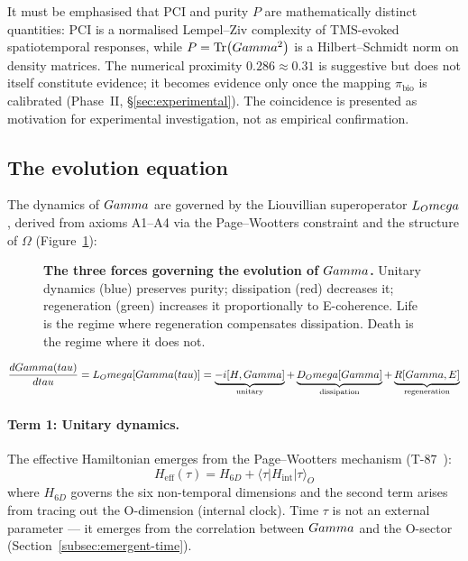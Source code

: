 It must be emphasised that PCI and purity $P$ are mathematically distinct
quantities: PCI is a normalised Lempel--Ziv complexity of TMS-evoked
spatiotemporal responses, while $P = \Tr(Gamma^2)$ is a Hilbert--Schmidt norm
on density matrices. The numerical proximity $0.286 \approx 0.31$ is
suggestive but does not itself constitute evidence; it becomes evidence only
once the mapping $\pi_{\mathrm{bio}}$ is calibrated (Phase~II,
\S\ref{sec:experimental}). The coincidence is presented as motivation for
experimental investigation, not as empirical confirmation.

\subsection{The evolution equation}
\label{subsec:evolution}

The dynamics of $Gamma$ are governed by the Liouvillian superoperator $L_Omega$,
derived from axioms A1--A4 via the Page--Wootters constraint and the structure of $\Omega$
(Figure~\ref{fig:evolution-flow}):

\begin{figure}[H]
\centering

\caption{\textbf{The three forces governing the evolution of $Gamma$.} Unitary dynamics
(blue) preserves purity; dissipation (red) decreases it; regeneration (green) increases
it proportionally to E-coherence. Life is the regime where regeneration compensates
dissipation. Death is the regime where it does not.}
\label{fig:evolution-flow}
\end{figure}

\begin{equation}
  \frac{dGamma(tau)}{dtau} = L_Omega[Gamma(tau)]
  = \underbrace{-i[H, Gamma]}_{\text{unitary}}
  + \underbrace{D_Omega[Gamma]}_{\text{dissipation}}
  + \underbrace{R[Gamma, E]}_{\text{regeneration}}
  \label{eq:evolution}
\end{equation}

\paragraph{Term 1: Unitary dynamics.}
The effective Hamiltonian emerges from the Page--Wootters mechanism (T-87~):
\begin{equation}
  H_{\mathrm{eff}}(\tau) = H_{6D} + \langle\tau|H_{\mathrm{int}}|\tau\rangle_O
  \label{eq:heff}
\end{equation}
where $H_{6D}$ governs the six non-temporal dimensions and the second term arises from
tracing out the O-dimension (internal clock). Time $\tau$ is not an external parameter
--- it emerges from the correlation between $Gamma$ and the O-sector
(Section~\ref{subsec:emergent-time}).

